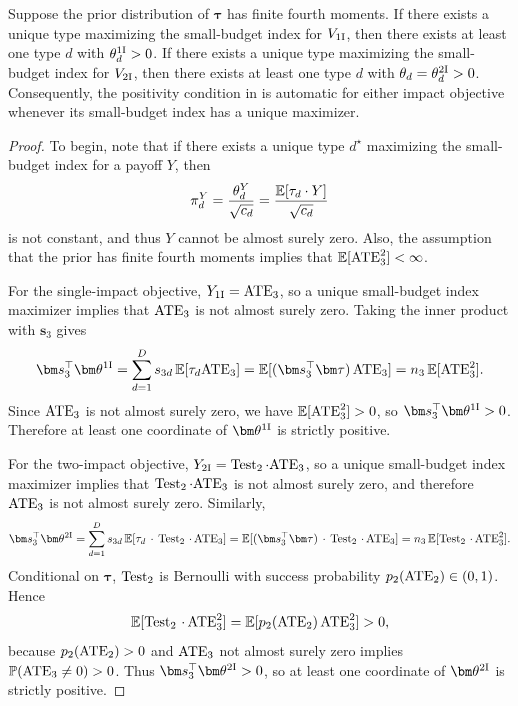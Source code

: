 \begin{proposition}
  \label{prop:positive-impact-objectives-appendix}
  Suppose the prior distribution of $\bm\tau$ has finite fourth moments.
  If there exists a unique type maximizing the small-budget index for $V_{\mathrm{1I}}$, then there exists at least one type $d$ with $\theta_d^{\mathrm{1I}}>0$.
  If there exists a unique type maximizing the small-budget index for $V_{\mathrm{2I}}$, then there exists at least one type $d$ with $\theta_d = \theta^{\mathrm{2I}}_d>0$.
  Consequently, the positivity condition in  is automatic for either impact objective whenever its small-budget index has a unique maximizer.

\end{proposition}

\begin{proof}
  To begin, note that if there exists a unique type $d^\star$ maximizing the small-budget index for a payoff $Y$, then
  \[
    \pi_d^Y = \frac{\theta_d^Y}{\sqrt{c_d}} = \frac{\mathbb{E}[\tau_d \cdot Y]}{\sqrt{c_d}}
  \]
  is not constant, and thus $Y$ cannot be almost surely zero.
  Also, the assumption that the prior has finite fourth moments implies that $\mathbb{E}[\mathrm{ATE}_3^2]<\infty$.

  For the single-impact objective, $Y_{\mathrm{1I}}=\mathrm{ATE}_3$, so a unique small-budget index maximizer implies that $\mathrm{ATE}_3$ is not almost surely zero.
  Taking the inner product with $\bm s_3$ gives
  \[
    \bm s_3^\top\bm\theta^{\singleimpact}
    =
    \sum_{d=1}^D s_{3d}\,\E[\tau_d \ATE_3]
    =
    \E[(\bm s_3^\top\bm\tau)\,\ATE_3]
    =
    n_3\,\E[\ATE_3^2].
  \]
  Since $\mathrm{ATE}_3$ is not almost surely zero, we have $\mathbb{E}[\mathrm{ATE}_3^2]>0$, so $\bm s_3^\top\bm\theta^{\singleimpact}>0$.
  Therefore at least one coordinate of $\bm\theta^{\singleimpact}$ is strictly positive.

  For the two-impact objective, $Y_{\mathrm{2I}}=\operatorname{Test}_2\cdot \mathrm{ATE}_3$, so a unique small-budget index maximizer implies that $\operatorname{Test}_2\cdot \mathrm{ATE}_3$ is not almost surely zero, and therefore $\mathrm{ATE}_3$ is not almost surely zero.
  Similarly,
  \[
    \bm s_3^\top\bm\theta^{\twoimpact}
    =
    \sum_{d=1}^D s_{3d}\,\E[\tau_d\,\cdot\,\Test_2\,\cdot\, \ATE_3]
    =
    \E[(\bm s_3^\top\bm\tau)\,\cdot\,\Test_2\,\cdot\, \ATE_3]
    =
    n_3\,\E[\Test_2\,\cdot\, \ATE_3^2].
  \]
  Conditional on $\bm\tau$, $\operatorname{Test}_2$ is Bernoulli with success probability $p_2(\mathrm{ATE}_2)\in(0,1)$.
  Hence
  \[
    \mathbb{E}[\operatorname{Test}_2\,\cdot\, \mathrm{ATE}_3^2]
    =
    \mathbb{E}[p_2(\mathrm{ATE}_2)\,\mathrm{ATE}_3^2]
    >
    0,
  \]
  because $p_2(\mathrm{ATE}_2)>0$ and $\mathrm{ATE}_3$ not almost surely zero implies $\mathbb{P}(\mathrm{ATE}_3\neq0)>0$.
  Thus $\bm s_3^\top\bm\theta^{\twoimpact}>0$, so at least one coordinate of $\bm\theta^{\twoimpact}$ is strictly positive.
\end{proof}

